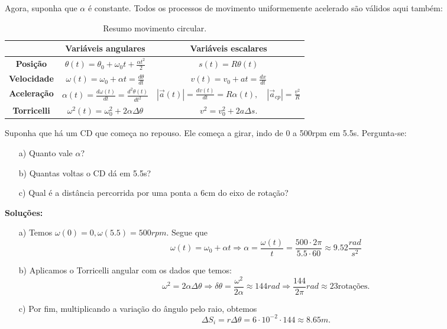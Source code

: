 \documentclass[physicsII_notes.tex]{subfiles}
\begin{document}
Agora, suponha que \(\alpha \) é constante. Todos os processos de movimento uniformemente acelerado são válidos aqui também:
\begin{table}[h!]
	\centering
	\begin{tabular}{|c|c|c|}
		\hline
		                    & \textbf{Variáveis angulares}                                    & \textbf{Variáveis escalares}                                                        \\
		\hline
		\textbf{Posição}    & $\theta(t) = \theta_{0} + \omega_{0}t + \frac{\alpha t^{2}}{2}$ & $s(t) = R\theta(t)$                                                                 \\
		\hline
		\textbf{Velocidade} & $\omega(t) = \omega_{0} + \alpha t = \frac{d\theta }{dt}$       & $v(t) = v_{0} + at = \frac{dx}{dt}$                                                 \\
		\hline
		\textbf{Aceleração} & $\alpha(t) = \frac{d\omega(t)}{dt} = \frac{d^2\theta(t)}{dt^2}$ & $|\vec{a}(t)| = \frac{dv(t)}{dt} = R\alpha(t),\quad |\vec{a}_{cp}| = \frac{v^2}{R}$ \\
		\hline
		\textbf{Torricelli} & $\omega^{2}(t) = \omega_{0}^{2} + 2\alpha \Delta \theta $       & $v^{2} = v_{0}^{2} + 2a\Delta s.$                                                   \\
		\hline
	\end{tabular}
	\caption{Resumo movimento circular.}
	\label{tab:my_label}
\end{table}

\begin{example}
	Suponha que há um CD que começa no repouso. Ele começa a girar, indo de 0 a 500rpm em 5.5s. Pergunta-se:
	\begin{itemize}
		\item[a)] Quanto vale \(\alpha \)?
		\item[b)] Quantas voltas o CD dá em 5.5s?
		\item[c)] Qual é a distância percorrida por uma ponta a 6cm do eixo de rotação?
	\end{itemize}

	\textbf{Soluções:}
	\begin{itemize}
		\item[a)] Temos \(\omega (0) = 0, \omega (5.5) = 500rpm.\) Segue que
		      \[
			      \omega(t) = \omega_{0} + \alpha t \Rightarrow \alpha  = \frac{\omega (t)}{t} = \frac{500 \cdot 2\pi}{5.5 \cdot 60}\approx 9.52 \frac{rad}{s^{2}}
		      \]

		\item[b)] Aplicamos o Torricelli angular com os dados que temos:
		      \[
			      \omega^{2} = 2\alpha \Delta \theta \Rightarrow \delta \theta = \frac{\omega^{2}}{2\alpha }\approx 144 rad \Rightarrow \frac{144}{2\pi}rad\approx 23\text{rotações}.
		      \]

		\item[c)] Por fim, multiplicando a variação do ângulo pelo raio, obtemos
		      \[
			      \Delta S_{i} = r\Delta \theta = 6 \cdot 10^{-2}\cdot 144\approx 8.65m.
		      \]
	\end{itemize}
\end{example}
\end{document}
